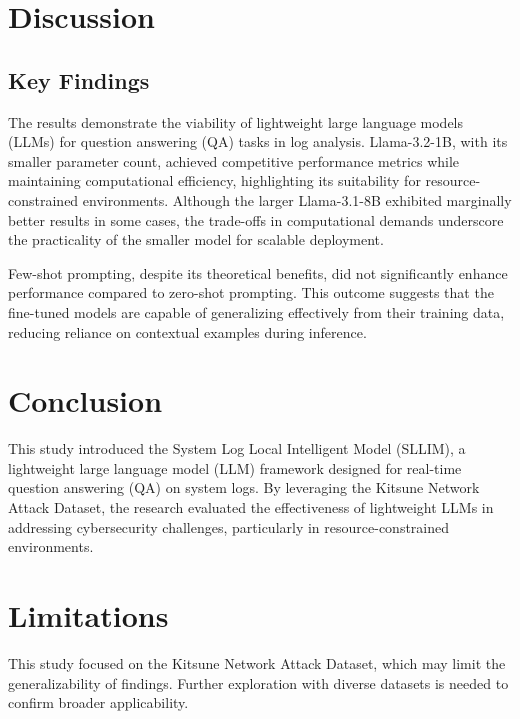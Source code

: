 \documentclass[11pt]{article}
\begin{document}
\section{Discussion}
\subsection{Key Findings}
The results demonstrate the viability of lightweight large language models (LLMs) for question answering (QA) tasks in log analysis. Llama-3.2-1B, with its smaller parameter count, achieved competitive performance metrics while maintaining computational efficiency, highlighting its suitability for resource-constrained environments. Although the larger Llama-3.1-8B exhibited marginally better results in some cases, the trade-offs in computational demands underscore the practicality of the smaller model for scalable deployment.

Few-shot prompting, despite its theoretical benefits, did not significantly enhance performance compared to zero-shot prompting. This outcome suggests that the fine-tuned models are capable of generalizing effectively from their training data, reducing reliance on contextual examples during inference.

\section{Conclusion}
This study introduced the System Log Local Intelligent Model (SLLIM), a lightweight large language model (LLM) framework designed for real-time question answering (QA) on system logs. By leveraging the Kitsune Network Attack Dataset, the research evaluated the effectiveness of lightweight LLMs in addressing cybersecurity challenges, particularly in resource-constrained environments.

\section*{Limitations}
This study focused on the Kitsune Network Attack Dataset, which may limit the generalizability of findings. Further exploration with diverse datasets is needed to confirm broader applicability.
\end{document}
